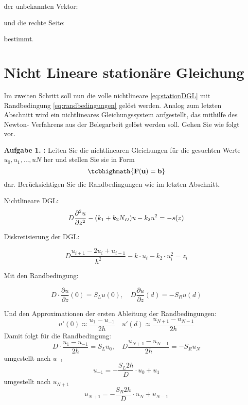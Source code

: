der unbekannten Vektor:


und die rechte Seite:


bestimmt.

\section{Nicht Lineare stationäre Gleichung}
\begin{mybox}
	Im zweiten Schritt soll nun die volle nichtlineare \cref{eq:stationDGL} mit Randbedingung \cref{eq:randbedingungen} gelöst werden. Analog
	zum letzten Abschnitt wird ein nichtlineares Gleichungssystem aufgestellt, das mithilfe des Newton-
	Verfahrens aus der Belegarbeit gelöst werden soll. Gehen Sie wie folgt vor.\cite{Prof.Dr.AndreasZeiser.April2021}
\end{mybox}

\begin{mybox}
	\textbf{Aufgabe 1. :} Leiten Sie die nichtlinearen Gleichungen für die gesuchten Werte $u_0,u_1,\dots ,uN$ her und stellen Sie
	sie in Form
	\begin{equation*}
		\tcbhighmath{\mathbf{F}(\mathbf{u})=\mathbf{b}}
	\end{equation*}
dar. Berücksichtigen Sie die Randbedingungen wie im letzten Abschnitt.
\cite{Prof.Dr.AndreasZeiser.April2021}
\end{mybox}
Nichtlineare DGL:
\begin{equation}
	D\pdv[2]{u}{z}-(k_1+k_2N_D)u-k_2u^2=-s(z)
\end{equation}

Diskretisierung der DGL:

\begin{equation}
	D\frac{u_{i+1}-2u_i+u_{i-1}}{h^2}-k\cdot u_i-k_2 \cdot u_i^2=z_i
\end{equation}

Mit den Randbedingung:

\begin{equation}
	D\cdot \frac{\partial u}{\partial z}(0)=S_Lu(0),\quad D\frac{\partial u}{\partial z}(d)=-S_Ru(d)
\end{equation}

Und den Approximationen der ersten Ableitung der  Randbedingungen:
\begin{equation}
	u'(0)\approx \frac{u_1-u_{-1}}{2h} \quad u'(d)\approx \frac{u_{N+1}-u_{N-1}}{2h}
\end{equation}
Damit folgt für die Randbedingung:
\begin{equation}
	D\cdot \frac{u_1-u_{-1}}{2h}=S_Lu_0,\quad D\frac{u_{N+1}-u_{N-1}}{2h}=-S_Ru_N
\end{equation}
umgestellt nach $u_{-1}$
\begin{equation}
	u_{-1}=-\frac{S_L 2h}{D}\cdot u_0+u_1
\end{equation}
umgestellt nach $u_{N+1}$
\begin{equation}
	u_{N+1}=-\frac{S_R2h}{D}\cdot u_N+u_{N-1}
\end{equation}



